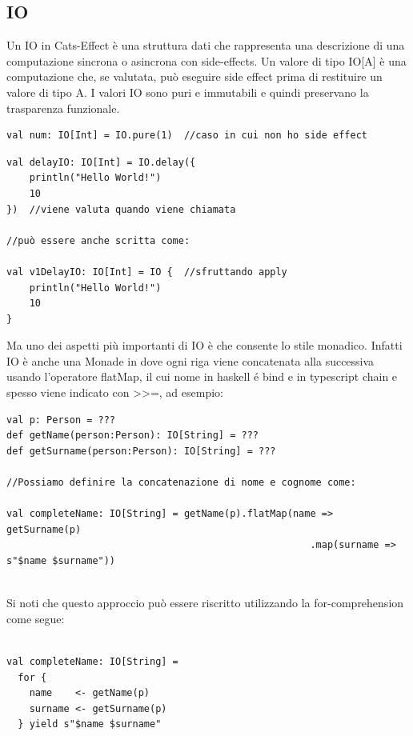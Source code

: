 \subsection{IO}
Un IO in Cats-Effect è una struttura dati che rappresenta una descrizione di una computazione sincrona o asincrona con side-effects. Un valore di tipo IO[A] è una computazione che, se valutata, può eseguire side effect prima di restituire un valore di tipo A. I valori IO sono puri e immutabili e quindi preservano la trasparenza funzionale.
\begin{verbatim}
val num: IO[Int] = IO.pure(1)  //caso in cui non ho side effect
\end{verbatim}
\begin{verbatim}
val delayIO: IO[Int] = IO.delay({ 
    println("Hello World!")
    10
})  //viene valuta quando viene chiamata

//può essere anche scritta come: 

val v1DelayIO: IO[Int] = IO {  //sfruttando apply
    println("Hello World!")
    10
} 
\end{verbatim}
Ma uno dei aspetti più importanti di IO è che consente lo stile monadico. Infatti IO è anche una Monade in dove ogni riga viene concatenata alla successiva usando l'operatore flatMap, il cui nome in haskell é bind e in typescript chain e spesso viene indicato con >>=, ad esempio:

\begin{verbatim}
val p: Person = ???
def getName(person:Person): IO[String] = ???
def getSurname(person:Person): IO[String] = ???

//Possiamo definire la concatenazione di nome e cognome come:

val completeName: IO[String] = getName(p).flatMap(name => getSurname(p)
                                                     .map(surname => s"$name $surname"))
    
\end{verbatim}

\noindent Si noti che questo approccio può essere riscritto utilizzando la for-comprehension come segue:
\begin{verbatim}

val completeName: IO[String] = 
  for {
    name    <- getName(p)
    surname <- getSurname(p)
  } yield s"$name $surname"
    
\end{verbatim}


